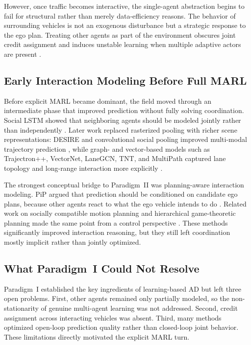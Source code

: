 \documentclass[12pt, a4paper]{article}
\begin{document}
However, once traffic becomes interactive, the single-agent abstraction begins to
fail for structural rather than merely data-efficiency reasons. The behavior of
surrounding vehicles is not an exogenous disturbance but a strategic response to
the ego plan. Treating other agents as part of the environment obscures joint
credit assignment and induces unstable learning when multiple adaptive actors are
present \cite{zhang2021multi,busoniu2008comprehensive}.

\subsection{Early Interaction Modeling Before Full MARL}

Before explicit MARL became dominant, the field moved through an intermediate
phase that improved prediction without fully solving coordination. Social LSTM
showed that neighboring agents should be modeled jointly rather than
independently \cite{alahi2016social}. Later work replaced rasterized pooling with
richer scene representations: DESIRE and convolutional social pooling improved
multi-modal trajectory prediction \cite{lee2017desire,deo2018convolutional},
while graph- and vector-based models such as Trajectron++, VectorNet, LaneGCN,
TNT, and MultiPath captured lane topology and long-range interaction more
explicitly \cite{gupta2018social,salzmann2020trajectron,gao2020vectornet,liang2020lanegcn,zhao2020tnt,chai2019multipath}.

The strongest conceptual bridge to Paradigm~II was planning-aware interaction
modeling. PiP argued that prediction should be conditioned on candidate ego
plans, because other agents react to what the ego vehicle intends to do
\cite{song2020pip}. Related work on socially compatible motion planning and
hierarchical game-theoretic planning made the same point from a control
perspective \cite{sadigh2016planning,fisac2019hierarchical,schwarting2019social,schwarting2021deep,fridovich2020efficient}. These methods significantly improved interaction reasoning, but they still left coordination mostly implicit rather than jointly optimized.

\subsection{What Paradigm~I Could Not Resolve}

Paradigm~I established the key ingredients of learning-based AD but left three
open problems. First, other agents remained only partially modeled, so the
non-stationarity of genuine multi-agent learning was not addressed. Second,
credit assignment across interacting vehicles was absent. Third, many methods
optimized open-loop prediction quality rather than closed-loop joint behavior.
These limitations directly motivated the explicit MARL turn.
\end{document}
